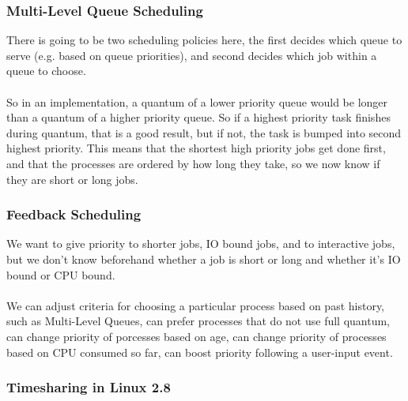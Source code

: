 \documentclass{article}
\begin{document}
\subsubsection{Multi-Level Queue Scheduling}

There is going to be two scheduling policies here, the first decides which queue to serve (e.g. based on queue priorities), and second decides which job within a queue to choose.
\\
\\
So in an implementation, a quantum of a lower priority queue would be longer than a quantum of a higher priority queue. So if a highest priority task finishes during quantum, that is a good result, but if not, the task is bumped into second highest priority. This means that the shortest high priority jobs get done first, and that the processes are ordered by how long they take, so we now know if they are short or long jobs.

\subsubsection{Feedback Scheduling}

We want to give priority to shorter jobs, IO bound jobs, and to interactive jobs, but we don't know beforehand whether a job is short or long and whether it's IO bound or CPU bound.\\
\\
We can adjust criteria for choosing a particular process based on past history, such as Multi-Level Queues, can prefer processes that do not use full quantum, can change priority of porcesses based on age, can change priority of processes based on CPU consumed so far, can boost priority following a user-input event.



\subsubsection{Timesharing in Linux 2.8}
\end{document}
